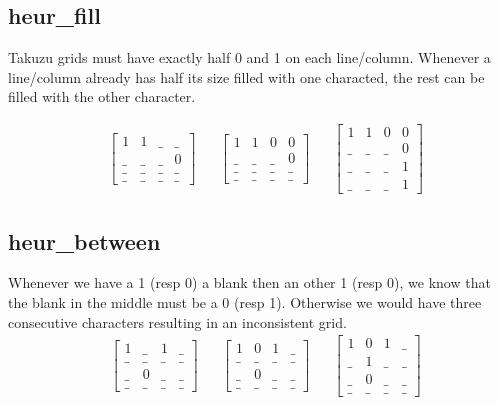 \documentclass{article}
\begin{document}
\subsection{heur\_fill}
Takuzu grids must have exactly half 0 and 1 on each line/column. Whenever a line/column already has half its size filled with one characted, the rest can be filled with the other character.

\begin{align*}
    & \begin{bmatrix}
        1 & 1 & \_ & \_ \\
        \_ & \_ & \_ & 0 \\
        \_ & \_ & \_ & \_ \\
        \_ & \_ & \_ & \_ 
    \end{bmatrix}
    && \begin{bmatrix}
        1 & 1 & 0 & 0 \\
        \_ & \_ & \_ & 0 \\
        \_ & \_ & \_ & \_ \\
        \_ & \_ & \_ & \_ 
    \end{bmatrix}
    && \begin{bmatrix}
        1 & 1 & 0 & 0 \\
        \_ & \_ & \_ & 0 \\
        \_ & \_ & \_ & 1 \\
        \_ & \_ & \_ & 1 
    \end{bmatrix}
\end{align*}

\subsection{heur\_between}
Whenever we have a 1 (resp 0) a blank then an other 1 (resp 0), we know that the blank in the middle must be a 0 (resp 1). Otherwise we would have three consecutive characters resulting in an inconsistent grid.
\begin{align*}
    & \begin{bmatrix}
        1 & \_ & 1 & \_ \\
        \_ & \_ & \_ & \_ \\
        \_ & 0 & \_ & \_ \\
        \_ & \_ & \_ & \_ 
    \end{bmatrix}
    && \begin{bmatrix}
        1 & 0 & 1 & \_ \\
        \_ & \_ & \_ & \_ \\
        \_ & 0 & \_ & \_ \\
        \_ & \_ & \_ & \_ 
    \end{bmatrix}
    && \begin{bmatrix}
        1 & 0 & 1 & \_ \\
        \_ & 1 & \_ & \_ \\
        \_ & 0 & \_ & \_ \\
        \_ & \_ & \_ & \_ 
    \end{bmatrix}
\end{align*}
\end{document}
